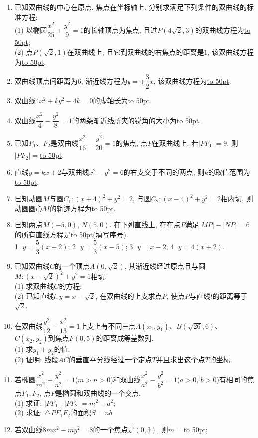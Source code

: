 \documentclass[10pt,a4paper]{article}
\newcommand{\blank}[1]{\underline{\hbox to #1pt{}}}
\begin{document}
\begin{enumerate}[1.]
\item 已知双曲线的中心在原点, 焦点在坐标轴上. 分别求满足下列条件的双曲线的标准方程:\\
(1) 以椭圆$\dfrac{x^2}{25}+\dfrac{y^2}9=1$的长轴顶点为焦点, 且过$P(4\sqrt 2,3)$的双曲线方程为\blank{50};\\
(2) 点$P(\sqrt 2,1)$在双曲线上, 且它到双曲线的右焦点的距离是$1$, 该双曲线方程为\blank{50}.
\item 双曲线顶点间距离为$6$, 渐近线方程为$y=\pm \dfrac 32x$, 该双曲线方程为\blank{50}.
\item 双曲线$4x^2+ky^2-4k=0$的虚轴长为\blank{50}.
\item 双曲线$\dfrac{x^2}4-\dfrac{y^2}8=1$的两条渐近线所夹的锐角的大小为\blank{50}.
\item 已知$F_1$、$F_2$是双曲线$\dfrac{x^2}{16}-\dfrac{y^2}{20}=1$的焦点, 点$P$在双曲线上. 若$|PF_1|=9$, 则$|PF_2|=$\blank{50}.
\item 直线$y=kx+2$与双曲线$x^2-y^2=6$的右支交于不同的两点, 则$k$的取值范围为\blank{50}.
\item 已知动圆$M$与圆$C_1:(x+4)^2+y^2=2$, 与圆$C_2:(x-4)^2+y^2=2$相内切, 则动圆圆心$M$的轨迹方程为\blank{50}.
\item 已知两点$M(-5,0)$, $N(5,0)$. 在下列直线上, 存在点$P$满足$|MP|-|NP|=6$的所有直线方程是\blank{50}(填写序号).\\ \textcircled{1} $y=\dfrac 53(x+2)$; \textcircled{2} $y=\dfrac 53(x-5)$; \textcircled{3} $y=x-2$; \textcircled{4} $y=4(x+2)$.
\item 已知双曲线$C$的一个顶点$A(0,\sqrt 2)$, 其渐近线经过原点且与圆$M:(x-\sqrt 2)^2+y^2=1$相切.\\
(1) 求双曲线$C$的方程;\\
(2) 已知直线$l:y=x-\sqrt 2$, 在双曲线的上支求点$P$, 使点$P$与直线$l$的距离等于$\sqrt 2$.
\item 在双曲线$\dfrac{y^2}{12}-\dfrac{x^2}{13}=1$上支上有不同三点$A(x_1,y_1)$、$B(\sqrt{26},6)$、$C(x_2,y_2)$到焦点$F(0,5)$的距离成等差数列.\\
(1) 求$y_1+y_2$的值;\\
(2) 证明: 线段$AC$的垂直平分线经过一个定点$T$并且求出这个点$T$的坐标.
\item 若椭圆$\dfrac{x^2}{m^2}+\dfrac{y^2}{n^2}=1$($m>n>0$)和双曲线$\dfrac{x^2}{a^2}-\dfrac{y^2}{b^2}=1$($a>0$, $b>0$)有相同的焦点$F_1,F_2$, 点$P$是椭圆和双曲线的一个交点.\\
(1) 求证: $|PF_1|\cdot |PF_2|=m^2-a^2$;\\
(2) 求证: $\triangle PF_1F_2$的面积$S=nb$.
\item 若双曲线$8mx^2-my^2=8$的一个焦点是$(0,3)$, 则$m=$\blank{50};

\end{enumerate}
\end{document}

